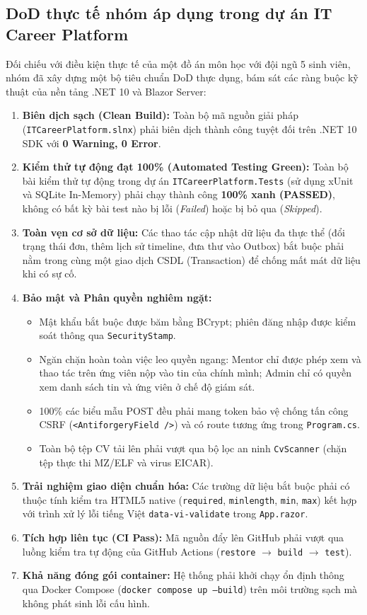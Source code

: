 \subsection{DoD thực tế nhóm áp dụng trong dự án IT Career Platform}
Đối chiếu với điều kiện thực tế của một đồ án môn học với đội ngũ 5 sinh viên, nhóm đã xây dựng một bộ tiêu chuẩn DoD thực dụng, bám sát các ràng buộc kỹ thuật của nền tảng .NET 10 và Blazor Server:
\begin{enumerate}
    \item \textbf{Biên dịch sạch (Clean Build):} Toàn bộ mã nguồn giải pháp (\texttt{ITCareerPlatform.slnx}) phải biên dịch thành công tuyệt đối trên .NET 10 SDK với \textbf{0 Warning, 0 Error}.
    \item \textbf{Kiểm thử tự động đạt 100\% (Automated Testing Green):} Toàn bộ bài kiểm thử tự động trong dự án \texttt{ITCareerPlatform.Tests} (sử dụng xUnit và SQLite In-Memory) phải chạy thành công \textbf{100\% xanh (PASSED)}, không có bất kỳ bài test nào bị lỗi (\textit{Failed}) hoặc bị bỏ qua (\textit{Skipped}).
    \item \textbf{Toàn vẹn cơ sở dữ liệu:} Các thao tác cập nhật dữ liệu đa thực thể (đổi trạng thái đơn, thêm lịch sử timeline, đưa thư vào Outbox) bắt buộc phải nằm trong cùng một giao dịch CSDL (Transaction) để chống mất mát dữ liệu khi có sự cố.
    \item \textbf{Bảo mật và Phân quyền nghiêm ngặt:}
    \begin{itemize}
        \item Mật khẩu bắt buộc được băm bằng BCrypt; phiên đăng nhập được kiểm soát thông qua \texttt{SecurityStamp}.
        \item Ngăn chặn hoàn toàn việc leo quyền ngang: Mentor chỉ được phép xem và thao tác trên ứng viên nộp vào tin của chính mình; Admin chỉ có quyền xem danh sách tin và ứng viên ở chế độ giám sát.
        \item 100\% các biểu mẫu POST đều phải mang token bảo vệ chống tấn công CSRF (\texttt{<AntiforgeryField />}) và có route tương ứng trong \texttt{Program.cs}.
        \item Toàn bộ tệp CV tải lên phải vượt qua bộ lọc an ninh \texttt{CvScanner} (chặn tệp thực thi MZ/ELF và virus EICAR).
    \end{itemize}
    \item \textbf{Trải nghiệm giao diện chuẩn hóa:} Các trường dữ liệu bắt buộc phải có thuộc tính kiểm tra HTML5 native (\texttt{required}, \texttt{minlength}, \texttt{min}, \texttt{max}) kết hợp với trình xử lý lỗi tiếng Việt \texttt{data-vi-validate} trong \texttt{App.razor}.
    \item \textbf{Tích hợp liên tục (CI Pass):} Mã nguồn đẩy lên GitHub phải vượt qua luồng kiểm tra tự động của GitHub Actions (\texttt{restore} $\rightarrow$ \texttt{build} $\rightarrow$ \texttt{test}).
    \item \textbf{Khả năng đóng gói container:} Hệ thống phải khởi chạy ổn định thông qua Docker Compose (\texttt{docker compose up --build}) trên môi trường sạch mà không phát sinh lỗi cấu hình.
\end{enumerate}

